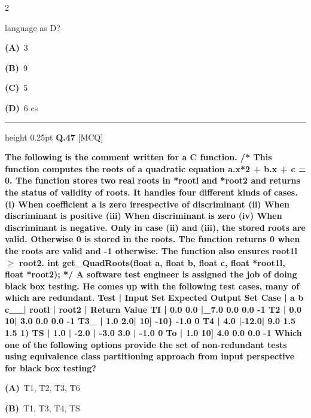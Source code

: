 \documentclass[a4paper,10pt,twoside]{article}
\begin{document}
\begin{multicols}{2}
{language as D? \par}
\par\vspace{2pt}\noindent
\textbf{(A)}~3\par\vspace{2pt}\noindent
\textbf{(B)}~9\par\vspace{2pt}\noindent
\textbf{(C)}~5\par\vspace{2pt}\noindent
\textbf{(D)}~6 \newline  {} cs
\par\vspace{6pt}\hrule height 0.25pt\vspace{6pt}
\noindent\textbf{Q.47} \hfill {\footnotesize\textsf{[MCQ]}}
\par\vspace{2pt}
{\bfseries The following is the comment written for a C function.
/* This function computes the roots of a quadratic equation
a.x*2 + b.x + c = 0. The function stores two real roots
in *rootl and *root2 and returns the status of validity
of roots. It handles four different kinds of cases.
(i) When coefficient a is zero irrespective of discriminant
(ii) When discriminant is positive
(iii) When discriminant is zero
(iv) When discriminant is negative.
Only in case (ii) and (iii), the stored roots are valid.
Otherwise 0 is stored in the roots. The function returns
0 when the roots are valid and -1 otherwise.
The function also ensures root1l $\ge$ root2.
int get\_QuadRoots(float a, float b, float c,
float *root1l, float *root2);
*/
A software test engineer is assigned the job of doing black box testing. He comes up with the
following test cases, many of which are redundant.
Test | Input Set Expected Output Set
Case | a b c\_\_| rootl | root2 | Return Value
TI | 0.0 0.0 |\_7.0 0.0 0.0 -1
T2 | 0.0 10| 3.0 0.0 0.0 -1
T3\_ | 1.0 2.0| 10] -10\} -1.0 0
T4 | 4.0 |-12.0| 9.0 1.5 1.5 1)
TS | 1.0 | -2.0 | -3.0 3.0 | -1.0 0
To | 1.0 10] 4.0 0.0 0.0 -1
Which one of the following options provide the set of non-redundant tests using equivalence class
partitioning approach from input perspective for black box testing? \par}
\par\vspace{2pt}\noindent
\textbf{(A)}~T1, T2, T3, T6\par\vspace{2pt}\noindent
\textbf{(B)}~T1, T3, T4, TS\par\vspace{2pt}\noindent

\end{multicols}
\end{document}
